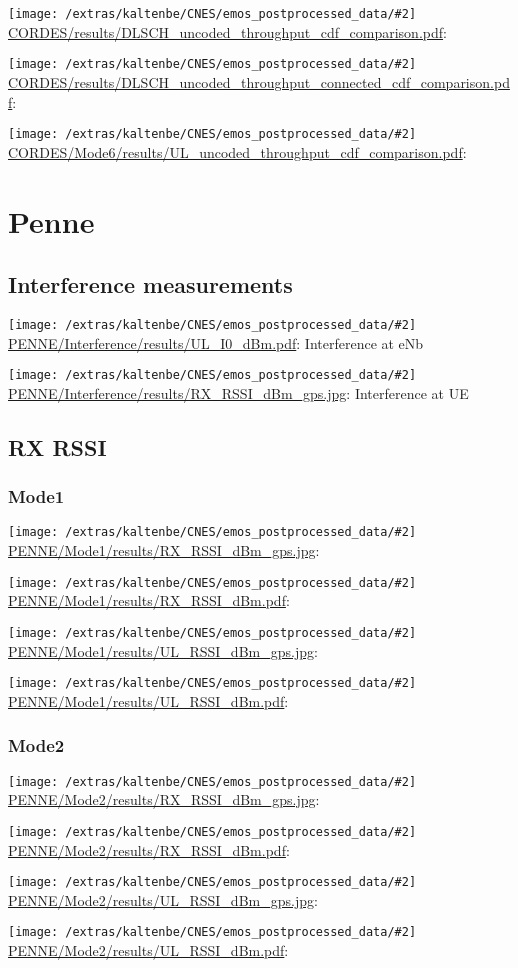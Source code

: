 \documentclass[a4paper,10pt]{article}
\newcommand{\printfile}[2][]{
 \begin{minipage}{8cm}
  \centering
  \texttt{[image: /extras/kaltenbe/CNES/emos\_postprocessed\_data/\#2]}
  \url{#2}: #1

 \end{minipage}
}
\begin{document}
\printfile{CORDES/results/DLSCH_uncoded_throughput_cdf_comparison.pdf}
\printfile{CORDES/results/DLSCH_uncoded_throughput_connected_cdf_comparison.pdf}

\printfile{CORDES/Mode6/results/UL_uncoded_throughput_cdf_comparison.pdf}

\section{Penne}
\label{sec:penne}

\subsection{Interference measurements}

\printfile[Interference at eNb]{PENNE/Interference/results/UL_I0_dBm.pdf}
\printfile[Interference at UE]{PENNE/Interference/results/RX_RSSI_dBm_gps.jpg}


\subsection{RX RSSI}


% 

\subsubsection{Mode1}
\printfile{PENNE/Mode1/results/RX_RSSI_dBm_gps.jpg}
\printfile{PENNE/Mode1/results/RX_RSSI_dBm.pdf}

\printfile{PENNE/Mode1/results/UL_RSSI_dBm_gps.jpg}
\printfile{PENNE/Mode1/results/UL_RSSI_dBm.pdf}

\subsubsection{Mode2}

\printfile{PENNE/Mode2/results/RX_RSSI_dBm_gps.jpg}
\printfile{PENNE/Mode2/results/RX_RSSI_dBm.pdf}

\printfile{PENNE/Mode2/results/UL_RSSI_dBm_gps.jpg}
\printfile{PENNE/Mode2/results/UL_RSSI_dBm.pdf}
\end{document}
